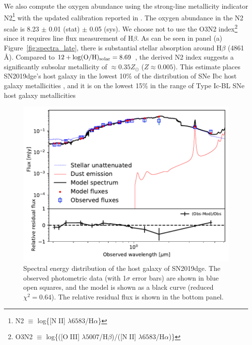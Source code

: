 \documentclass[twocolumn]{aastex63}
\newcommand{\name}{SN2019dge}
\def\ion#1#2{#1$\;${\footnotesize\rm{#2}}\relax}
\begin{document}
We also compute the oxygen abundance using the 
strong-line metallicity indicator N2\footnote{N2 $\equiv$ log\{[\ion{N}{II}] $\lambda 6583$/H$\alpha$\}} 
\citep{Pettini2004} with the updated calibration reported in 
\citet{Marino2013}. The oxygen abundance in the N2 scale is 8.23 $\pm$ 0.01 (stat) $\pm$ 0.05 (sys). 
We choose not to use the O3N2 index\footnote{O3N2 $\equiv$ log\{([\ion{O}{III}] $\lambda 
	5007$/H$\beta$)/([\ion{N}{II}] $\lambda6583$/H$\alpha$)\}} since it requires line flux 
measurement of H$\beta$. As can be 
seen in panel (a) Figure~\ref{fig:spectra_late}, there is substantial stellar absorption around H$\beta$ 
(4861\,\AA). Compared to $12+{\rm log(O/H)_{\rm solar}} = 8.69$ 
\citep{Asplund2009}, the derived N2 index suggests a significantly subsolar metallicity of $\approx 
0.35 Z_\odot$ ($Z\approx 0.005$). This estimate places \name's host galaxy in the lowest 
10\% of the distribution of SNe Ibc host galaxy metallicities \citep{Sanders2012}, and it is on the lowest 
15\% in the range of Type Ic-BL SNe host galaxy metallicities \citep{Modjaz2020}

\begin{figure}[htbp!]
	\centering
	\includegraphics[width=\columnwidth]{figures/SDSSJ17+50_best_model.pdf}
	\caption{Spectral energy distribution of the host galaxy of \name. The observed photometric 
		data (with 1$\sigma$ error bars) are shown in blue open squares, and the 
		model is shown as a black curve (reduced $\chi^2 = 0.64$). The relative residual flux is shown in 
		the 
		bottom panel.
		\label{fig:SEDfit}}
\end{figure}
\end{document}

